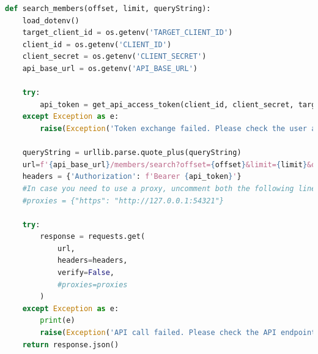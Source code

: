 \begin{lstlisting}[language=python, caption=Membership SDK implementation., label=lst:mb_sdk_implement]
def search_members(offset, limit, queryString):
    load_dotenv()
    target_client_id = os.getenv('TARGET_CLIENT_ID')
    client_id = os.getenv('CLIENT_ID')
    client_secret = os.getenv('CLIENT_SECRET')
    api_base_url = os.getenv('API_BASE_URL')

    try:
        api_token = get_api_access_token(client_id, client_secret, target_client_id)
    except Exception as e:
        raise(Exception('Token exchange failed. Please check the user and the application credentials'))

    queryString = urllib.parse.quote_plus(queryString)
    url=f'{api_base_url}/members/search?offset={offset}&limit={limit}&queryString={queryString}'
    headers = {'Authorization': f'Bearer {api_token}'}
    #In case you need to use a proxy, uncomment both the following line and also the one on the request. You also need to set your proxy address and port
    #proxies = {"https": "http://127.0.0.1:54321"}

    try:
        response = requests.get(
            url,
            headers=headers,
            verify=False,
            #proxies=proxies
        )
    except Exception as e:
        print(e)
        raise(Exception('API call failed. Please check the API endpoint'))
    return response.json()
\end{lstlisting}







